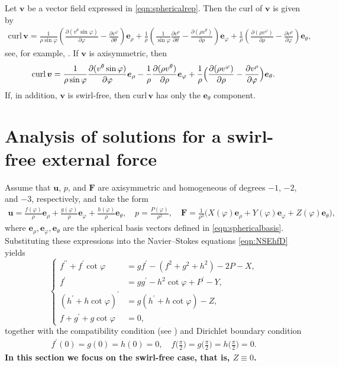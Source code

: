 \documentclass{amsart}
\newcommand{\curl}{\mathrm{curl}}
\newcommand{\te}{\theta}
\newcommand{\p}{\partial}
\newcommand{\vp}{\varphi}
\newcommand{\Bv}{{\boldsymbol{v}}}
\newcommand{\Bu}{{\boldsymbol{u}}}
\newcommand{\Be}{{\boldsymbol{e}}}
\newcommand{\BF}{{\boldsymbol{F}}}
\begin{document}
Let $\Bv$ be a vector field expressed in \eqref{eqn:sphericalrep}. Then the curl  of $\Bv$ is given by
\begin{equation}\label{eqn:sphericalcurl}
\begin{aligned}
\curl \, \Bv=
\frac{1}{\rho\sin\vp}
\left(
\frac{\p(v^{\te}\sin\vp)}{\p\vp}-\frac{\p v^{\vp}}{\p\te}
\right)
\Be_{\rho}
+\frac{1}{\rho}
\left(\frac{1}{\sin\vp}\frac{\p v^{\rho}}{\p\te}-\frac{\p(\rho v^{\te})}{\p\rho}\right)\Be_{\vp}
+\frac{1}{\rho}
\left(\frac{\p(\rho v^{\vp})}{\p\rho}-\frac{\p v^{\rho}}{\p\vp}\right)\Be_{\te},  
\end{aligned}
\end{equation}
see, for example, \cite[eq.~(2.47)]{AW95}.
If $\Bv$ is axisymmetric, then
\[
\curl\,\Bv = \frac{1}{\rho\sin\vp}\frac{\p(v^{\te}\sin\vp)}{\p\vp}\Be_{\rho}
- \frac{1}{\rho}\frac{\p(\rho v^{\te})}{\p\rho}\Be_{\vp}
+ \frac{1}{\rho}\Bigl(\frac{\p(\rho v^{\vp})}{\p\rho} - \frac{\p v^{\rho}}{\p\vp}\Bigr)\Be_{\te}.
\]
If, in addition, $\Bv$ is swirl-free, then $\curl\,\Bv$ has only the $\Be_{\theta}$ component.


\section{Analysis of solutions for a swirl-free external force}\label{sec:No-Swirl}


Assume that $\Bu$, $p$, and $\BF$ are axisymmetric and homogeneous of degrees $-1$, $-2$, and $-3$, respectively, and take the form
\begin{align*}
\Bu = \frac{f(\varphi)}{\rho} \Be_\rho + \frac{g(\varphi)}{\rho} \Be_\varphi + \frac{h(\varphi)}{\rho} \Be_\theta, \quad
p = \frac{P(\varphi)}{\rho^2},
\quad 
\BF = \frac{1}{\rho^3}\bigl( X(\varphi)\Be_\rho + Y(\varphi)\Be_\varphi + Z(\varphi)\Be_\theta \bigr),
\end{align*}
where $\Be_\rho, \Be_\varphi, \Be_\theta$ are the spherical basis vectors defined in \eqref{eqn:sphericalbasis}.  
Substituting these expressions into the Navier--Stokes equations \eqref{eqn:NSEhfD} yields
\begin{equation}\label{eqn:halfD1}
\left\{
\begin{aligned}
   f^{\prime\prime} + f^{\prime} \cot \varphi &= gf^{\prime} -(f^2 + g^2 + h^2) - 2P - X, \\
   f^{\prime} &= gg^{\prime} - h^2 \cot \varphi + P^{\prime} - Y, \\ 
   (h^\prime + h\cot \varphi)^{\prime} &= g(h^\prime + h\cot \varphi) - Z,\\
   f+ g^\prime + g\cot \varphi &=0,
\end{aligned}
\right.
\end{equation}
together with the compatibility condition (see \cite[Corollary~1, Lemma~2]{LW09})  and Dirichlet boundary condition
\begin{align}\label{eqn:halfDbc}
f^\prime(0) = g(0) = h(0) = 0, \quad f\bigl(\tfrac{\pi}{2}\bigr) = g\bigl(\tfrac{\pi}{2}\bigr) = h\bigl(\tfrac{\pi}{2}\bigr) = 0.
\end{align}
{\bf In this section we focus on the swirl-free case, that is, $Z\equiv0$.}
\end{document}
